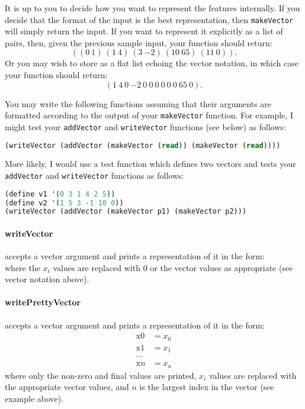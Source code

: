 \documentclass[12pt,info]{asg}
\begin{document}
It is up to you to decide how you want to represent the features internally. If you decide that the format of the input is the best representation, then \texttt{makeVector} will simply return the input. If you want to represent it explicitly as a list of pairs, then, given the previous sample input, your function should return:
\begin{equation}
((0\  1)\  (1\  4)\  (3\  {-2})\  (10\  65)\  (11\  0)).
\end{equation}
Or you may wish to store as a flat list echoing the vector notation, in which case your function should return:
\begin{equation}
(1\  4\  0\  {-2}\  0\  0\  0\  0\  0\  0\  65\  0).
\end{equation}

You may write the following functions assuming that their arguments are formatted according to the output of your \texttt{makeVector} function. For example, I might test your \texttt{addVector} and \texttt{writeVector} functions (see below) as follows:
\begin{lstlisting}[language=Lisp]
(writeVector (addVector (makeVector (read)) (makeVector (read))))
\end{lstlisting}

More likely, I would use a test function which defines two vectors and tests your \texttt{addVector} and \texttt{writeVector} functions as follows:
\begin{lstlisting}[language=Lisp]
(define v1 '(0 3 1 4 2 5))
(define v2 '(1 5 3 -1 10 0))
(writeVector (addVector (makeVector p1) (makeVector p2)))
\end{lstlisting}

\paragraph{writeVector} accepts a vector argument and prints a representation of it in the form:
\begin{equation}
[x_0, x_1, x_2, .... x_n]
\end{equation}
where the $x_i$ values are replaced with 0 or the vector values as appropriate (see vector notation above).

\paragraph{writePrettyVector} accepts a vector argument and prints a representation of it in the form:
\begin{align*}
\text{x0} & = x_0\\
\text{x1} & = x_1\\
\cdots\\
\text{x}n & = x_n
\end{align*}
where only the non-zero and final values are printed, $x_i$ values are replaced with the appropriate vector values, and $n$ is the largest index in the vector (see example above).
\end{document}

